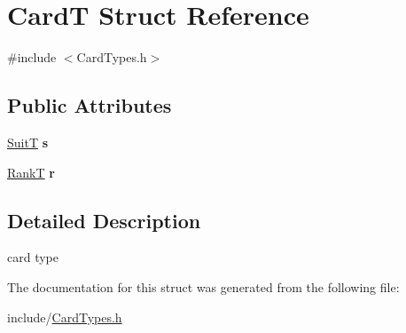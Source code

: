 \hypertarget{struct_card_t}{}\section{CardT Struct Reference}
\label{struct_card_t}


{\ttfamily \#include $<$Card\+Types.\+h$>$}

\subsection*{Public Attributes}
\begin{DoxyCompactItemize}
\item 
\mbox{\label{struct_card_t_a385c4f8ec261203df28f85f69f28780d}} 
\hyperlink{_card_types_8h_a693d1a7b7ef1b91ead9c7dfc49830565}{SuitT} {\bfseries s}
\item 
\mbox{\label{struct_card_t_a306faf354f2fb4bb43439f84bbc49f05}} 
\hyperlink{_card_types_8h_aa7b61ab74252d345d621b846db6238f1}{RankT} {\bfseries r}
\end{DoxyCompactItemize}


\subsection{Detailed Description}
card type 

The documentation for this struct was generated from the following file\+:\begin{DoxyCompactItemize}
\item 
include/\hyperlink{_card_types_8h}{Card\+Types.\+h}\end{DoxyCompactItemize}
